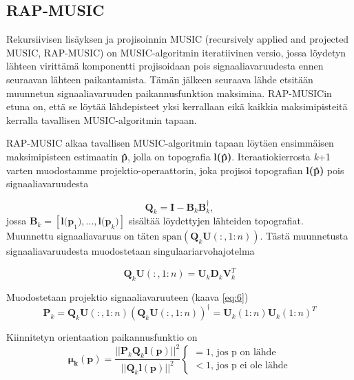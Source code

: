 \subsection{RAP-MUSIC}
Rekursiivisen lisäyksen ja projisoinnin MUSIC (recursively applied and projected MUSIC, RAP-MUSIC) on MUSIC-algoritmin iteratiivinen versio, jossa löydetyn lähteen virittämä komponentti projisoidaan pois signaaliavaruudesta ennen seuraavan lähteen paikantamista. Tämän jälkeen seuraava lähde etsitään muunnetun signaaliavaruuden paikannusfunktion maksimina. RAP-MUSICin etuna on, että se löytää lähdepisteet yksi kerrallaan eikä kaikkia maksimipisteitä kerralla tavallisen MUSIC-algoritmin tapaan. \citep{Mosher1999SourceMUSIC, Makela2018TruncatedLocalization}

RAP-MUSIC alkaa tavallisen MUSIC-algoritmin tapaan löytäen ensimmäisen maksimipisteen estimaatin \textbf{\^p}, jolla on topografia \textbf{l(\^p)}. Iteraatiokierrosta \textit{k}+1 varten muodostamme projektio-operaattorin, joka projisoi topografian \textbf{l(\^p)} pois signaaliavaruudesta

\begin{equation}
    \mathbf{Q}_k = \mathbf{I}-\mathbf{B}_k\mathbf{B}_k^\dagger,
\end{equation}
jossa $\mathbf{B}_k = [\mathbf{l(p}_1),...,\mathbf{l(p}_{k})]$ sisältää löydettyjen lähteiden topografiat. Muunnettu signaaliavaruus on täten $\text{span}(\mathbf{Q}_k\mathbf{U}(:,1:n))$. Tästä muunnetusta signaaliavaruudesta muodostetaan singulaariarvohajotelma

\begin{equation}
    \mathbf{Q}_k\mathbf{U}(:,1:n) = \mathbf{U}_k\mathbf{D}_k\mathbf{V}_k^T
\end{equation}

Muodostetaan projektio signaaliavaruuteen (kaava \ref{eq:6})
\begin{equation}
    \mathbf{P}_k = \mathbf{Q}_k\mathbf{U}(:,1:n)(\mathbf{Q}_k\mathbf{U}(:,1:n))^{\dagger} = \mathbf{U}_k(1:n)\mathbf{U}_k(1:n)^T
\end{equation}

Kiinnitetyn orientaation paikannusfunktio on
\begin{equation}
    \mathbf{\mu_k(p)} = \frac{||\mathbf{P}_k\mathbf{Q}_k\mathbf{l(p)}||^2}{||\mathbf{Q}_k\mathbf{l(p)}||^2}
    \begin{cases}
    =1\text{, jos p on lähde}\\
    <1\text{, jos p ei ole lähde}
     \end{cases}
\end{equation}

